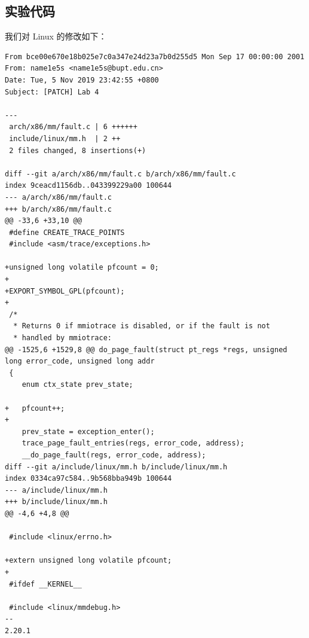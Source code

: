 \documentclass[blue,normal,cn]{elegantnote}
\begin{document}
\subsection{实验代码}
我们对 Linux 的修改如下：
\begin{lstlisting}
From bce00e670e18b025e7c0a347e24d23a7b0d255d5 Mon Sep 17 00:00:00 2001
From: name1e5s <name1e5s@bupt.edu.cn>
Date: Tue, 5 Nov 2019 23:42:55 +0800
Subject: [PATCH] Lab 4

---
 arch/x86/mm/fault.c | 6 ++++++
 include/linux/mm.h  | 2 ++
 2 files changed, 8 insertions(+)

diff --git a/arch/x86/mm/fault.c b/arch/x86/mm/fault.c
index 9ceacd1156db..043399229a00 100644
--- a/arch/x86/mm/fault.c
+++ b/arch/x86/mm/fault.c
@@ -33,6 +33,10 @@
 #define CREATE_TRACE_POINTS
 #include <asm/trace/exceptions.h>
 
+unsigned long volatile pfcount = 0;
+
+EXPORT_SYMBOL_GPL(pfcount);
+
 /*
  * Returns 0 if mmiotrace is disabled, or if the fault is not
  * handled by mmiotrace:
@@ -1525,6 +1529,8 @@ do_page_fault(struct pt_regs *regs, unsigned long error_code, unsigned long addr
 {
 	enum ctx_state prev_state;
 
+	pfcount++;
+
 	prev_state = exception_enter();
 	trace_page_fault_entries(regs, error_code, address);
 	__do_page_fault(regs, error_code, address);
diff --git a/include/linux/mm.h b/include/linux/mm.h
index 0334ca97c584..9b568bba949b 100644
--- a/include/linux/mm.h
+++ b/include/linux/mm.h
@@ -4,6 +4,8 @@
 
 #include <linux/errno.h>
 
+extern unsigned long volatile pfcount;
+
 #ifdef __KERNEL__
 
 #include <linux/mmdebug.h>
-- 
2.20.1
\end{lstlisting}
\end{document}
